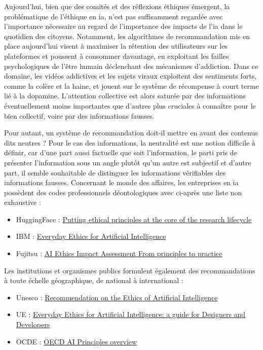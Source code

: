 Aujourd'hui, bien que des comités et des réflexions éthiques émergent, la problématique de l'éthique en \gls{ia}, n'est pas suffisamment regardée avec l'importance nécessaire au regard de l'importance des impacts de l'\gls{ia} dans le quotidien des citoyens.
Notamment, les algorithmes de recommandation mis en place aujourd'hui visent à maximiser la rétention des utilisateurs sur les plateformes et poussent à consommer davantage, en exploitant les failles psychologiques de l'être humain déclenchant des mécanismes d'addiction. Dans ce domaine, les vidéos addictives et les sujets viraux exploitent des sentiments forts, comme la colère et la haine, et jouent sur le système de récompense à court terme lié à la dopamine. L'attention collective est alors saturée par des informations éventuellement moins importantes que d'autres plus cruciales à connaître pour le bien collectif, voire par des informations fausses.

Pour autant, un système de recommandation doit-il mettre en avant des contenus dits neutres ? Pour le cas des informations, la neutralité est une notion difficile à définir, car d'une part aussi factuelle que soit l'information, le parti pris de présenter l'information sous un angle plutôt qu'un autre est subjectif et d'autre part, il semble souhaitable de distinguer les informations vérifiables des informations fausses.
Concernant le monde des affaires, les entreprises en \gls{ia} possèdent des codes professionnels déontologiques avec ci-après une liste non exhaustive  : 

\begin{itemize}
    \item HuggingFace : \href{https://huggingface.co/blog/ethical-charter-multimodal}{Putting ethical principles at the core of the research lifecycle}
    \item IBM : \href{https://www.ibm.com/watson/assets/duo/pdf/everydayethics.pdf}{Everyday
Ethics
for Artificial
Intelligence}
    \item Fujitsu : \href{https://www.fujitsu.com/global/about/research/technology/aiethics/}{AI Ethics Impact
Assessment
From principles
to practice}
\end{itemize}

Les institutions et organismes publics formulent également des recommandations à toute échelle géographique, de national à international : 

\begin{itemize}
    \item Unesco : \href{https://unesdoc.unesco.org/ark:/48223/pf0000381137}{Recommendation on the Ethics of Artificial Intelligence
}
    \item UE : \href{https://futurium.ec.europa.eu/en/european-ai-alliance/blog/everyday-ethics-artificial-intelligence-guide-designers-and-developers}{Everyday Ethics for Artificial Intelligence: a guide for Designers and Developers}
    \item OCDE : \href{https://oecd.ai/en/ai-principles}{OECD AI Principles overview}
\end{itemize}


